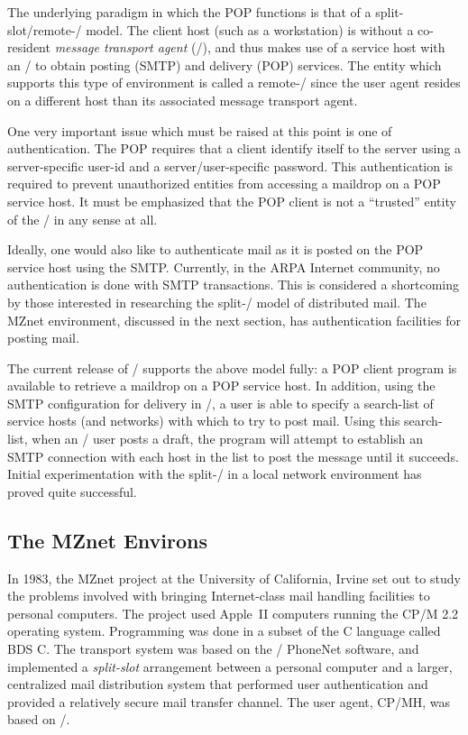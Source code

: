The underlying paradigm in which the POP functions is that of a
split-slot/remote-\UA/ model.
The client host (such as a workstation) is without a co-resident
{\it message transport agent} (\MTA/),
and thus makes use of a service host with an \MTA/ to obtain posting (SMTP)
and delivery (POP) services.
The entity which supports this type of environment is called a remote-\UA/
since the user agent resides on a different host than its associated message
transport agent.

One very important issue which must be raised at this point is one of
authentication.
The POP requires that a client identify itself to the server using a
server-specific user-id and a server/user-specific password.
This authentication is required to prevent unauthorized entities from
accessing a maildrop on a POP service host.
It must be emphasized that the POP client is not a ``trusted'' entity of the
\MTS/ in any sense at all.

Ideally,
one would also like to authenticate mail as it is posted on the POP service
host using the SMTP.
Currently,
in the ARPA Internet community,
no authentication is done with SMTP transactions.
This is considered a shortcoming by those interested in researching the
split-\UA/ model of distributed mail.
The MZnet environment,
discussed in the next section,
has authentication facilities for posting mail.

The current release of \MH/ supports the above model fully:
a POP client program is available to retrieve a maildrop on a POP service
host.
In addition,
using the SMTP configuration for delivery in \MH/,
a user is able to specify a search-list of service hosts (and networks)
with which to try to post mail.
Using this search-list,
when an \MH/ user posts a draft,
the  program will attempt to establish an SMTP connection
with each host in the list to post the message until it succeeds.
Initial experimentation with the split-\UA/
in a local network environment has proved quite successful.

\subsection{The MZnet Environs}			%
In 1983,
the MZnet project\cite{EStef84} at the University of California, Irvine
set out to study the problems involved with bringing
Internet-class mail handling facilities to personal computers.
The project used Apple~II computers running the CP/M 2.2 operating system.
Programming was done in a subset of the C language called BDS C.
The transport system was based on the \MMDF/ PhoneNet software,
and implemented a {\it split-slot} arrangement between a personal computer
and a larger,
centralized mail distribution system that performed user
authentication and provided a relatively secure mail transfer channel.
The user agent, CP/MH, was based on \MH/.

